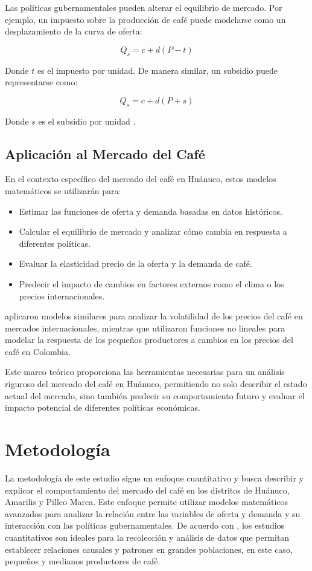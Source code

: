 \documentclass[12pt, a4paper]{article}
\begin{document}
Las políticas gubernamentales pueden alterar el equilibrio de mercado. Por ejemplo, un impuesto sobre la producción de café puede modelarse como un desplazamiento de la curva de oferta:

\[Q_s = c + d(P - t)\]

Donde $t$ es el impuesto por unidad. De manera similar, un subsidio puede representarse como:

\[Q_s = c + d(P + s)\]

Donde $s$ es el subsidio por unidad \parencite{nicholson2017}.

\subsection{Aplicación al Mercado del Café}

En el contexto específico del mercado del café en Huánuco, estos modelos matemáticos se utilizarán para:

\begin{itemize}
    \item Estimar las funciones de oferta y demanda basadas en datos históricos.
    \item Calcular el equilibrio de mercado y analizar cómo cambia en respuesta a diferentes políticas.
    \item Evaluar la elasticidad precio de la oferta y la demanda de café.
    \item Predecir el impacto de cambios en factores externos como el clima o los precios internacionales.
\end{itemize}

\cite{bacon2015} aplicaron modelos similares para analizar la volatilidad de los precios del café en mercados internacionales, mientras que \cite{rueda2018} utilizaron funciones no lineales para modelar la respuesta de los pequeños productores a cambios en los precios del café en Colombia.

Este marco teórico proporciona las herramientas necesarias para un análisis riguroso del mercado del café en Huánuco, permitiendo no solo describir el estado actual del mercado, sino también predecir su comportamiento futuro y evaluar el impacto potencial de diferentes políticas económicas.

\section{Metodología}

La metodología de este estudio sigue un enfoque cuantitativo y busca describir y explicar el comportamiento del mercado del café en los distritos de Huánuco, Amarilis y Pillco Marca. Este enfoque permite utilizar modelos matemáticos avanzados para analizar la relación entre las variables de oferta y demanda y su interacción con las políticas gubernamentales. De acuerdo con \cite{creswell2014}, los estudios cuantitativos son ideales para la recolección y análisis de datos que permitan establecer relaciones causales y patrones en grandes poblaciones, en este caso, pequeños y medianos productores de café.
\end{document}
